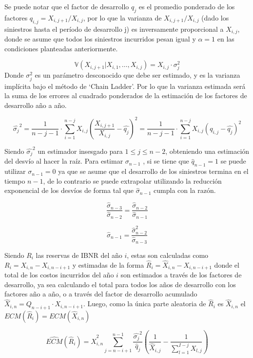 \documentclass[
  12pt,
]{article}
\begin{document}
Se puede notar que el factor de desarrollo \(q_j\) es el promedio
ponderado de los factores \(q_{i,j}=X_{i,j+1}/X_{i,j}\), por lo que la
varianza de \(X_{i,j+1}/X_{i,j}\) (dado los siniestros hasta el período
de desarrollo j) es inversamente proporcional a \(X_{i,j}\), donde se
asume que todos los siniestros incurridos pesan igual y \(\alpha=1\) en
las condiciones planteadas anteriormente.

\[
\mathbb{V}(X_{i,j+1}|X_{i,1},\ldots,X_{i,j}) = X_{i,j}\cdot \sigma_j^2
\] Donde \(\sigma_j^2\) es un parámetro desconocido que debe ser
estimado, y es la varianza implícita bajo el método de `Chain Ladder'.
Por lo que la varianza estimada será la suma de los errores al cuadrado
ponderados de la estimación de los factores de desarrollo año a año.

\[
\hat{\sigma_j}^2 = \frac{1}{n-j-1}\cdot \sum_{i=1}^{n-j} X_{i,j}\left( \frac{X_{i,j+1}}{X_{i,j}} - \hat{q_j} \right)^2=\frac{1}{n-j-1}\cdot \sum_{i=1}^{n-j} X_{i,j}\left( q_{i,j} - \hat{q_j} \right)^2
\]

Siendo \(\hat{\sigma_j}^2\) un estimador insesgado para
\(1 \leq j \leq n-2\), obteniendo una estimación del desvío al hacer la
raíz. Para estimar \(\sigma_{n-1}\) , si se tiene que
\(\hat{q}_{n-1}=1\) se puede utilizar \(\sigma_{n-1}=0\) ya que se asume
que el desarrollo de los siniestros termina en el tiempo \(n-1\), de lo
contrario se puede extrapolar utilizando la reducción exponencial de los
desvíos de forma tal que \(\hat{\sigma}_{n-1}\) cumpla con la razón.

\[
\frac{\hat{\sigma}_{n-3}}{\hat{\sigma}_{n-2}} = \frac{\hat{\sigma}_{n-2}}{\hat{\sigma}_{n-1}}
\]

\[
\hat{\sigma}_{n-1} = \frac{\hat{\sigma}_{n-2}^2}{\hat{\sigma}_{n-3}}
\]

Siendo \(R_i\) las reservas de IBNR del año \(i\), estas son calculadas
como \(R_i = X_{i,n} - X_{i,n-i+1}\) y estimadas de la forma
\(\hat{R}_i = \hat{X}_{i,n} - X_{i,n-i+1}\) donde el total de los costos
incurridos del año \(i\) son estimados a través de los factores de
desarrollo, ya sea calculando el total para todos los años de desarrollo
con los factores año a año, o a través del factor de desarrollo
acumulado \(\hat{X}_{i,n} = Q_{n-i+1}\cdot X_{i,n-i+1}\). Luego, como la
única parte aleatoria de \(\hat{R}_i\) es \(\hat{X}_{i,n}\) el
\(ECM(\hat{R}_i) = ECM(\hat{X}_{i,n})\)

\[
\widehat{ECM}(\hat{R}_i) = \hat{X}_{i,n}^2 \sum_{j=n-i+1}^{n-1} \frac{\hat{\sigma_j}^2}{\hat{q}_j}\left( \frac{1}{\hat{X}_{i,j}} - \frac{1}{\sum_{l=1}^{I-j}X_{l,j}} \right)
\]
\end{document}
